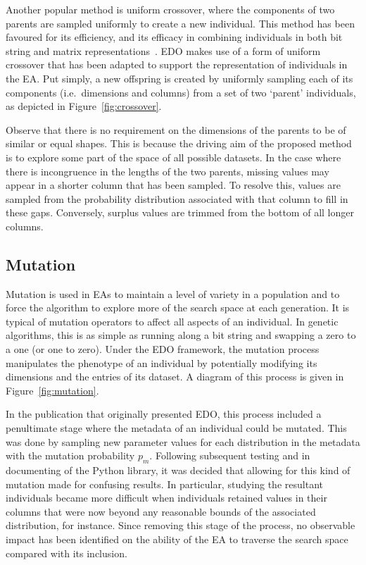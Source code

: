 Another popular method is uniform crossover, where the components of two parents
are sampled uniformly to create a new individual. This method has been favoured
for its efficiency, and its efficacy in combining individuals in both bit string
and matrix representations~\cite{Chen2018,Semenkin2012}. EDO makes use of
a form of uniform crossover that has been adapted to support the representation
of individuals in the EA. Put simply, a new offspring is created by uniformly
sampling each of its components (i.e.\ dimensions and columns) from a set of two
`parent' individuals, as depicted in Figure~\ref{fig:crossover}.


Observe that there is no requirement on the dimensions of the parents to be of
similar or equal shapes. This is because the driving aim of the proposed method
is to explore some part of the space of all possible datasets. In the case where
there is incongruence in the lengths of the two parents, missing values may
appear in a shorter column that has been sampled. To resolve this, values are
sampled from the probability distribution associated with that column to fill in
these gaps. Conversely, surplus values are trimmed from the bottom of all longer
columns.


\subsection{Mutation}\label{subsection:mutation}


Mutation is used in EAs to maintain a level of variety in a population and to
force the algorithm to explore more of the search space at each generation.
It is typical of mutation operators to affect all aspects of an individual. In
genetic algorithms, this is as simple as running along a bit string and swapping
a zero to a one (or one to zero). Under the EDO framework, the mutation process
manipulates the phenotype of an individual by potentially modifying its
dimensions and the entries of its dataset. A diagram of this process is given in
Figure~\ref{fig:mutation}.

In the publication that originally presented EDO, this process included a
penultimate stage where the metadata of an individual could be mutated. This was
done by sampling new parameter values for each distribution in the metadata with
the mutation probability \(p_m\). Following subsequent testing and in
documenting of the Python library, it was decided that allowing for this kind of
mutation made for confusing results. In particular, studying the resultant
individuals became more difficult when individuals retained values in their
columns that were now beyond any reasonable bounds of the associated
distribution, for instance. Since removing this stage of the process, no
observable impact has been identified on the ability of the EA to traverse the
search space compared with its inclusion.

